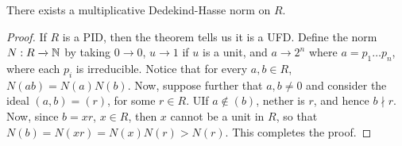 \begin{corollary}
  There exists a multiplicative Dedekind-Hasse norm on $R$.
\end{corollary}
\begin{proof}
  If $R$ is a PID, then the theorem tells us it is a UFD. Define the norm $N:R
  \xrightarrow{} \mathbb{N}$ by taking $0 \xrightarrow{} 0$, $u \xrightarrow{} 1$ if
  $u$ is a unit, and  $a \xrightarrow{} 2^n$ where $a=p_1 \dots p_n$, where
  each $p_i$ is irreducible. Notice that for every  $a,b \in R$,
  $N(ab)=N(a)N(b)$. Now, suppose further that $a,b \neq 0$ and consider the
  ideal  $(a,b)=(r)$, for some $r \in R$. UIf  $a \notin (b)$, nether is $r$,
  and hence  $b \nmid r$. Now, since  $b=xr$,  $x \in R$, then  $x$ cannot be
  a unit in  $R$, so that  $N(b)=N(xr)=N(x)N(r)>N(r)$. This completes the
  proof.
\end{proof}
